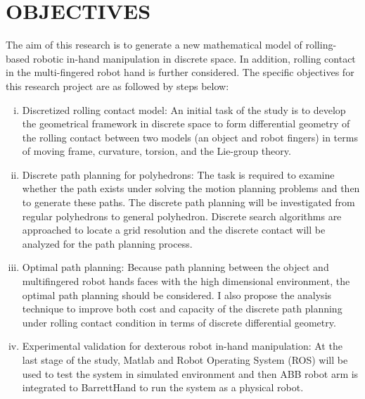 \section{OBJECTIVES}

\noindent The aim of this research is to generate a new mathematical model of rolling-based robotic in-hand manipulation in discrete space.  In addition, rolling contact in the multi-fingered robot hand is further considered. The specific objectives for this research project are as followed by steps below:
\begin{enumerate}[(i)]
  \item Discretized rolling contact model: An initial task of the study is to develop the geometrical framework in discrete space to form differential geometry of the rolling contact between two models (an object and robot fingers) in terms of moving frame, curvature, torsion, and the Lie-group theory.
   
  \item Discrete path planning for polyhedrons: The task is required to examine whether the path exists under solving the motion planning problems and then to generate these paths. The discrete path planning will be investigated from regular polyhedrons to general polyhedron. Discrete search algorithms are approached to locate a grid resolution and the discrete contact will be analyzed for the path planning process. 
  
  
  
  \item Optimal path planning: Because path planning between the object and multifingered robot hands faces with the high dimensional environment, the optimal path planning should be considered. I also propose the analysis technique to improve both cost and capacity of the discrete path planning under rolling contact condition in terms of discrete differential geometry. 
  
  
  \item Experimental validation for dexterous robot in-hand manipulation: At the last stage of the study, Matlab and Robot Operating System (ROS) will be used to test the system in simulated environment and then ABB robot arm is integrated to BarrettHand to run the system as a physical robot.
  
\end{enumerate}



